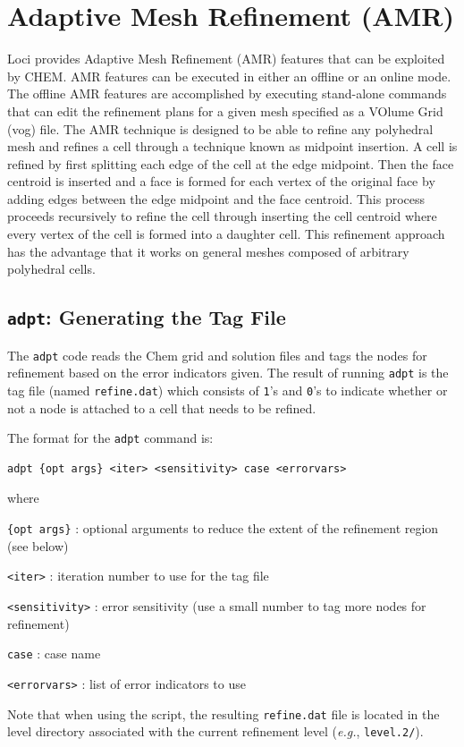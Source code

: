 \section{Adaptive Mesh Refinement (AMR)}

Loci provides Adaptive Mesh Refinement (AMR) features that can be
exploited by CHEM.  AMR features can be executed in either an offline
or an online mode.  The offline AMR features are accomplished by
executing stand-alone commands that can edit the refinement plans for
a given mesh specified as a VOlume Grid (vog) file.  The AMR technique
is designed to be able to refine any polyhedral mesh and refines a
cell through a technique known as midpoint insertion.  A cell is
refined by first splitting each edge of the cell at the edge midpoint.
Then the face centroid is inserted and a face is formed for each
vertex of the original face by adding edges between the edge midpoint
and the face centroid.  This process proceeds recursively to refine
the cell through inserting the cell centroid where every vertex of the
cell is formed into a daughter cell.  This refinement approach has the
advantage that it works on general meshes composed of arbitrary
polyhedral cells.


\subsection{{\tt adpt}: Generating the Tag File}
The \verb!adpt! code reads the Chem grid and solution files and tags
the nodes for refinement based on the error indicators given.  The
result of running \verb!adpt! is the tag file (named
\verb!refine.dat!) which consists of {\tt 1}'s and {\tt 0}'s to
indicate whether or not a node is attached to a cell that needs to be
refined.

The format for the \verb!adpt! command is:

\begin{verbatim}
adpt {opt args} <iter> <sensitivity> case <errorvars>
\end{verbatim}

\noindent
where

\begin{description}
\item {\tt \verb!{!opt args\verb!}!} :  optional arguments to reduce the extent of the refinement region (see below)
\item {\tt <iter>} :  iteration number to use for the tag file
\item {\tt <sensitivity>} :  error sensitivity (use a small number to tag more nodes for refinement)
\item {\tt case} :  case name
\item {\tt <errorvars>} :  list of error indicators to use
\end{description}
\noindent
Note that when using the script, the resulting \verb!refine.dat! file
is located in the level directory associated with the current
refinement level ({\it{e.g.}}, \verb!level.2/!).

